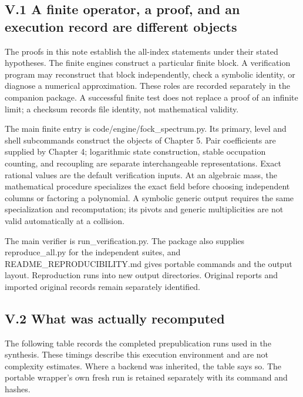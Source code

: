\documentclass[a4paper,11pt]{article}
\numberwithin{equation}{section}
\begin{document}
\hypertarget{v.1-a-finite-operator-a-proof-and-an-execution-record-are-different-objects}{%
\subsection{V.1 A finite operator, a proof, and an execution record are different objects}\label{v.1-a-finite-operator-a-proof-and-an-execution-record-are-different-objects}}

The proofs in this note establish the all-index statements under their stated hypotheses. The finite engines construct a particular finite block. A verification program may reconstruct that block independently, check a symbolic identity, or diagnose a numerical approximation. These roles are recorded separately in the companion package. A successful finite test does not replace a proof of an infinite limit; a checksum records file identity, not mathematical validity.

The main finite entry is code/engine/fock\_spectrum.py. Its primary, level and shell subcommands construct the objects of Chapter 5. Pair coefficients are supplied by Chapter 4; logarithmic state construction, stable occupation counting, and recoupling are separate interchangeable representations. Exact rational values are the default verification inputs. At an algebraic mass, the mathematical procedure specializes the exact field before choosing independent columns or factoring a polynomial. A symbolic generic output requires the same specialization and recomputation; its pivots and generic multiplicities are not valid automatically at a collision.

The main verifier is run\_verification.py. The package also supplies reproduce\_all.py for the independent suites, and README\_REPRODUCIBILITY.md gives portable commands and the output layout. Reproduction runs into new output directories. Original reports and imported original records remain separately identified.

\hypertarget{v.2-what-was-actually-recomputed}{%
\subsection{V.2 What was actually recomputed}\label{v.2-what-was-actually-recomputed}}

The following table records the completed prepublication runs used in the synthesis. These timings describe this execution environment and are not complexity estimates. Where a backend was inherited, the table says so. The portable wrapper's own fresh run is retained separately with its command and hashes.
\end{document}
